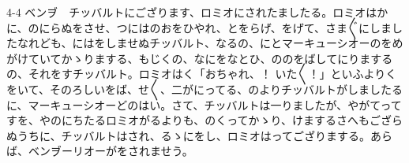 \documentclass[tate,paper=b6j,jafontsize=9pt]{jlreq}
\begin{document}
\begin{azconvIndented}{4\zw}{-4\zw}
ベンヺ　チッバルトにござります、ロミオにされたましたる。ロミオはかに、のにらぬをさせ、つにはのおをひやれ、とをらげ、をげて、さま{〴〵}にしましたなれども、にはをしませぬチッバルト、なるの、にとマーキューシオーのをめがけていてかゝりまする、もじくの、なにをなとひ、ののをばしてにりまするの、それをすチッバルト。ロミオはく「おちゃれ、！ いた{〳〵}！」といふよりくをいて、そのろしいをば、せ{〳〵}、二がにってる、のよりチッバルトがしましたるに、マーキューシオーどのはい。さて、チッバルトは一りましたが、やがてってすを、やのにちたるロミオがるよりも、のくってかゝり、けまするさへもござらぬうちに、チッバルトはされ、るゝにをし、ロミオはってござりまする。あらば、ベンヺーリオーがをされませう。


\end{azconvIndented}
\end{document}
